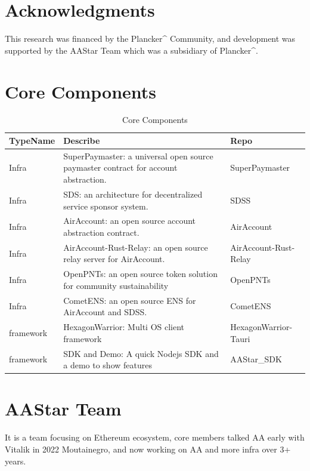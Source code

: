 \documentclass[preprint,12pt]{elsarticle}
\begin{document}
\section{Acknowledgments}
\label{sec:acknowledgments}

This research was financed by the Plancker\^{} Community, and development was supported by the AAStar Team which was a subsidiary of Plancker\^{}.

\appendix
\section{Core Components}
\label{app:core-components}

\begin{table}[ht]
\centering
\begin{tabular}{|p{2cm}|p{6cm}|p{6cm}|}
\hline
\textbf{TypeName} & \textbf{Describe} & \textbf{Repo} \\
\hline
Infra & SuperPaymaster: a universal open source paymaster contract for account abstraction. & SuperPaymaster \\
\hline
Infra & SDS: an architecture for decentralized service sponsor system. & SDSS \\
\hline
Infra & AirAccount: an open source account abstraction contract. & AirAccount \\
\hline
Infra & AirAccount-Rust-Relay: an open source relay server for AirAccount. & AirAccount-Rust-Relay \\
\hline
Infra & OpenPNTs: an open source token solution for community sustainability & OpenPNTs \\
\hline
Infra & CometENS: an open source ENS for AirAccount and SDSS. & CometENS \\
\hline
framework & HexagonWarrior: Multi OS client framework & HexagonWarrior-Tauri \\
\hline
framework & SDK and Demo: A quick Nodejs SDK and a demo to show features & AAStar\_SDK \\
\hline
\end{tabular}
\caption{Core Components}
\label{tab:core-components}
\end{table}

\section{AAStar Team}
It is a team focusing on Ethereum ecosystem, core members talked AA early with Vitalik in 2022 Moutainegro, and now working on AA and more infra over 3+ years.
\end{document}
